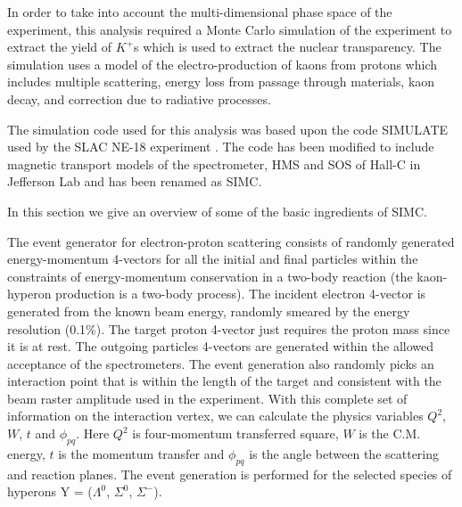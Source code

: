 %
%
%
In order to take into account the multi-dimensional phase space of the experiment, this analysis required a Monte Carlo simulation of the experiment to extract the yield of $K^+$s which is used to extract the nuclear transparency. The simulation uses a model of the electro-production of kaons from protons which includes multiple scattering, energy loss from passage through materials, kaon decay, and correction due to radiative processes.

The simulation code used for this analysis was based upon the code SIMULATE used by the SLAC NE-18 experiment \cite{PhysRevC.64.054610}. The code has been modified to include magnetic transport models of the spectrometer, HMS and SOS of Hall-C in Jefferson Lab and has been renamed as SIMC.

%
%
%
\label{Ingredients of SIMC}
In this section we give an overview of some of the basic ingredients of SIMC.

\label{Event Generation}
The event generator for electron-proton scattering consists of randomly generated energy-momentum 4-vectors for all the initial and final particles within the constraints of energy-momentum conservation in a two-body reaction (the kaon-hyperon production is a two-body process). The incident electron 4-vector is generated from the known beam energy, randomly smeared by the energy resolution (0.1\%). The target proton 4-vector just requires the proton mass since it is at rest. The outgoing particles 4-vectors are generated within the allowed acceptance of the spectrometers. The event generation also randomly picks an interaction point that is within the length of the target and consistent with the beam raster amplitude used in the experiment. With this complete set of information on the interaction vertex, we can calculate the physics variables $Q^2$, $W$, $t$ and $\phi_{pq}$. Here $Q^2$ is four-momentum transferred square, $W$ is the C.M. energy, $t$ is the momentum transfer and $\phi_{pq}$ is  the angle between the scattering and reaction planes. The event generation is performed for the selected species of hyperons Y = ($\Lambda^0$, $\Sigma^0$, $\Sigma^-$).

